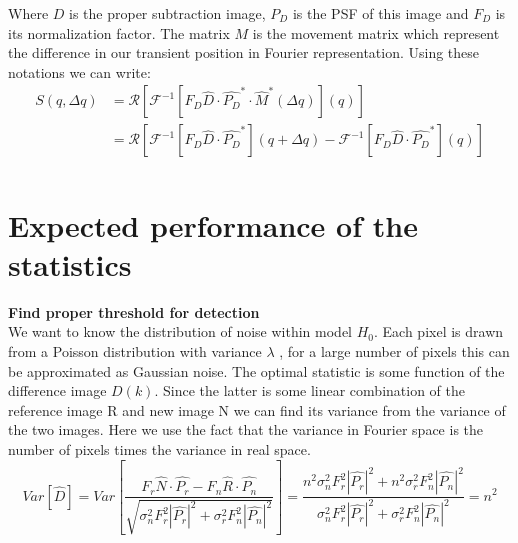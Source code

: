 \documentclass[a4paper]{article}
\newcommand{\rb}[1]{\left(#1\right)}
\newcommand{\sqb}[1]{\left[#1\right]}
\newcommand{\abs}[1]{\left|#1\right|}
\begin{document}
	Where $D$ is the proper subtraction image, $P_D$ is the PSF of this image and $F_D$ is its normalization factor. The matrix $M$ is the movement matrix which represent the difference in our transient position in Fourier representation. Using these notations we can write:
	\begin{equation}
	\begin{split}
	S\rb{q,\Delta q} & = \mathcal{R}\sqb{\mathcal{F}^{-1}\sqb{F_D \hat{D} \cdot \hat{P_D}^* \cdot \hat{M}^*\rb{\Delta q}}\rb{q}}\\
	& =\mathcal{R}\sqb{\mathcal{F}^{-1}\sqb{F_D \hat{D} \cdot \hat{P_D}^*}\rb{q + \Delta q} - \mathcal{F}^{-1}\sqb{F_D \hat{D} \cdot \hat{P_D}^*}\rb{q}}\\
	\end{split}
	\end{equation}
	
	\section{Expected performance of the statistics}
	\textbf{Find proper threshold for detection}\\
	We want to know the distribution of noise within model $H_0$. Each pixel is drawn from a Poisson distribution with variance $\lambda$ , for a large number of pixels this can be approximated as Gaussian noise. The optimal statistic  is some function of the difference image $D(k)$. Since the latter is some linear combination of the reference image R and new image N we can find its variance from the variance of the two images.
	Here we use the fact that the variance in Fourier space is the number of pixels times the variance in real space.
	\begin{equation}
	Var\sqb{\hat{D}} = Var\sqb{\frac{F_r \hat{N} \cdot \hat{P_r} - F_n \hat{R}\cdot \hat{P_n}}{\sqrt{\sigma^2_n F_r^2 \abs{\hat{P_r}}^2 + \sigma^2_r F_n^2 \abs{\hat{P_n}}^2}}}=\frac{n^2\sigma^2_n F_r^2 \abs{\hat{P_r}}^2 + n^2\sigma^2_r F_n^2 \abs{\hat{P_n}}^2}{\sigma^2_n F_r^2 \abs{\hat{P_r}}^2 + \sigma^2_r F_n^2 \abs{\hat{P_n}}^2}=n^2
	\end{equation}
	
\end{document}
